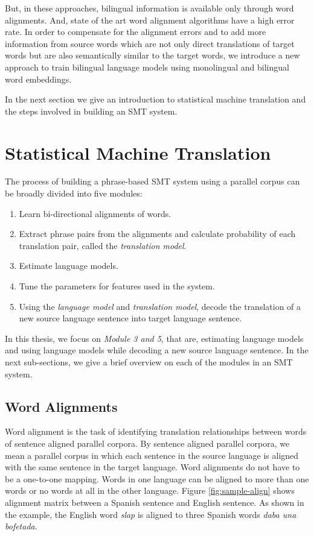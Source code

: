 But, in these approaches, bilingual information is available only through word alignments. And, state of the art word alignment algorithms have a high error rate. In order to compensate for the alignment errors and to add more information from source words which are not only direct translations of target words but are also semantically similar to the target words, we introduce a new approach to train bilingual language models using monolingual and bilingual word embeddings.

In the next section we give an introduction to statistical machine translation and the steps involved in building an SMT system.

\section{Statistical Machine Translation}
The process of building a phrase-based SMT system using a parallel corpus can be broadly divided into five modules:
\begin{enumerate}
	\item Learn bi-directional alignments of words.
	\item Extract phrase pairs from the alignments and calculate probability of each translation pair, called the \textit{translation model}.
	\item Estimate language models.
	\item Tune the parameters for features used in the system.
	\item Using the \textit{language model} and \textit{translation model}, decode the translation of a new source language sentence into target language sentence.
\end{enumerate}

In this thesis, we focus on \textit{Module 3 and 5}, that are, estimating language models and using language models while decoding a new source language sentence. In the next sub-sections, we give a brief overview on each of the modules in an SMT system.

\subsection{Word Alignments}\label{section:alignments}
Word alignment is the task of identifying translation relationships between words of sentence aligned parallel corpora. By sentence aligned parallel corpora, we mean a parallel corpus in which each sentence in the source language is aligned with the same sentence in the target language. Word alignments do not have to be a one-to-one mapping. Words in one language can be aligned to more than one words or no words at all in the other language. Figure \ref{fig:sample-align} shows alignment matrix between a Spanish sentence and English sentence. As shown in the example, the English word \textit{slap} is aligned to three Spanish words \textit{daba una bofetada}.

